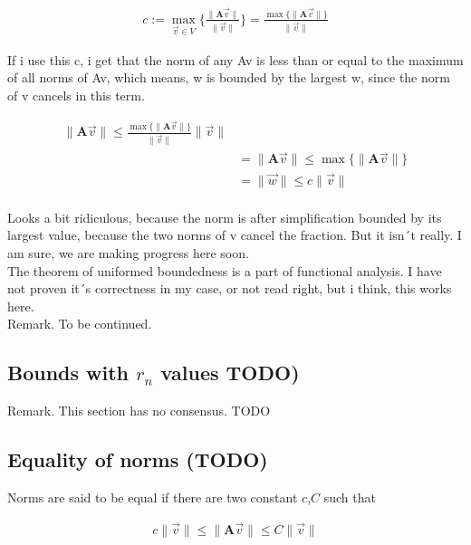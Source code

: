 \documentclass[a4paper]{article}
\begin{document}
\begin{displaymath}
\begin{align}
c := \max_{\vec{v} \in V}\{ \frac{\|\boldsymbol{A}\vec{v}\|}{\|\vec{v}\|} \} = \frac{\max\{\|\boldsymbol{A}\vec{v}\|\}}{\|\vec{v}\|}
\end{align}
\end{displaymath}

If i use this c, i get that the norm of any Av is less than or equal to the maximum of all norms of Av, which means, w is bounded by the largest w, since the norm of v cancels in this term.

\begin{displaymath}
\begin{align}
\|\boldsymbol{A}\vec{v}\| \leq \frac{\max\{\|\boldsymbol{A}\vec{v}\|\}}{\|\vec{v}\|}\|\vec{v}\| \\
&= \|\boldsymbol{A}\vec{v}\| \leq \max\{\|\boldsymbol{A}\vec{v}\|\}\\
&= \|\vec{w}\| \leq c\|\vec{v}\| \\
\end{align}
\end{displaymath}

Looks a bit ridiculous, because the norm is after simplification bounded by its largest value, because the two norms of v cancel the fraction. But it isn´t really. I am sure, we are making progress here soon.\\

The theorem of uniformed boundedness is a part of functional analysis. I have not proven it´s correctness in my case, or not read right, but i think, this works here.\\

Remark. To be continued.\\


\subsection{Bounds with $r_n$ values TODO)}

Remark. This section has no consensus. TODO

\subsection{Equality of norms (TODO)}

Norms are said to be equal if there are two constant $c$,$C$ such that

\begin{displaymath}
\begin{align}
    c\|\vec{v}\| \leq \|\boldsymbol{A}\vec{v}\| \leq C\|\vec{v}\|
\end{align}
\end{displaymath}
\end{document}
